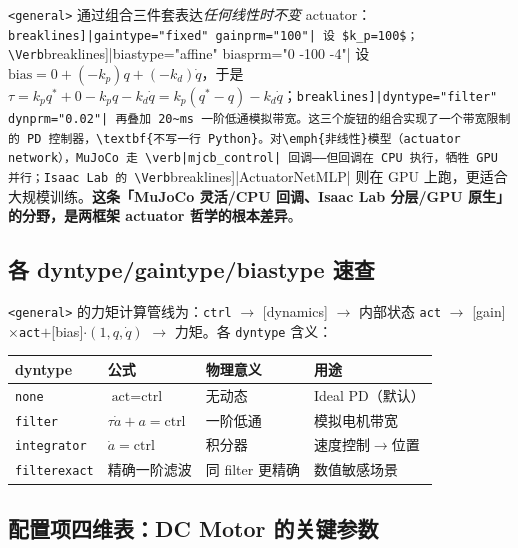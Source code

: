 \begin{insight}\label{ins:rlmc-act-general}
\verb|<general>| 通过组合三件套表达\emph{任何线性时不变} actuator：\Verb[breaklines]|gaintype="fixed" gainprm="100"| 设 $k_p=100$；\Verb[breaklines]|biastype="affine" biasprm="0 -100 -4"| 设 $\text{bias}=0+(-k_p)q+(-k_d)\dot q$，于是 $\tau=k_p q^* + 0 - k_p q - k_d\dot q = k_p(q^*-q)-k_d\dot q$；\Verb[breaklines]|dyntype="filter" dynprm="0.02"| 再叠加 20~ms 一阶低通模拟带宽。这三个旋钮的组合实现了一个带宽限制的 PD 控制器，\textbf{不写一行 Python}。对\emph{非线性}模型（actuator network），MuJoCo 走 \verb|mjcb_control| 回调——但回调在 CPU 执行，牺牲 GPU 并行；Isaac Lab 的 \Verb[breaklines]|ActuatorNetMLP| 则在 GPU 上跑，更适合大规模训练。\textbf{这条「MuJoCo 灵活/CPU 回调、Isaac Lab 分层/GPU 原生」的分野，是两框架 actuator 哲学的根本差异}。
\end{insight}

\subsection{各 dyntype/gaintype/biastype 速查}
\label{sec:rlmc-act-general-table}

\verb|<general>| 的力矩计算管线为：\verb|ctrl| $\to$ [dynamics] $\to$ 内部状态 \verb|act| $\to$ [gain]$\times$\verb|act|$+$[bias]$\cdot(1,q,\dot q)$ $\to$ 力矩。各 \verb|dyntype| 含义：

\begin{center}
\small
\begin{tabular}{@{}lllp{3.2cm}@{}}
\toprule
dyntype & 公式 & 物理意义 & 用途 \\
\midrule
\verb|none| & $\text{act}=\text{ctrl}$ & 无动态 & Ideal PD（默认） \\
\verb|filter| & $\tau\dot a + a = \text{ctrl}$ & 一阶低通 & 模拟电机带宽 \\
\verb|integrator| & $\dot a = \text{ctrl}$ & 积分器 & 速度控制$\to$位置 \\
\verb|filterexact| & 精确一阶滤波 & 同 filter 更精确 & 数值敏感场景 \\
\bottomrule
\end{tabular}
\end{center}

\subsection{配置项四维表：DC Motor 的关键参数}
\label{sec:rlmc-act-cfg4d}

